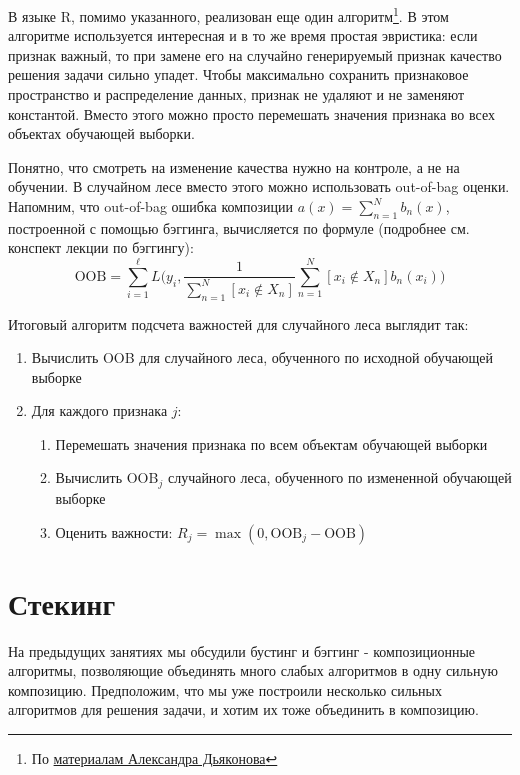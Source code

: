 \documentclass[12pt,a4paper]{article}
\begin{document}
     \par В языке R, помимо указанного, реализован еще один алгоритм\footnote{По \href{http://www.machinelearning.ru/wiki/images/c/cc/PZAD2016_09_rf.pdf}{материалам Александра Дьяконова}}. В этом алгоритме используется интересная и в то же время простая эвристика: если признак важный, то при замене его на случайно генерируемый признак качество решения задачи сильно упадет. Чтобы максимально сохранить признаковое пространство и распределение данных, признак не удаляют и не заменяют константой. Вместо этого можно просто перемешать значения признака во всех объектах обучающей выборки.
     
     Понятно, что смотреть на изменение качества нужно на контроле, а не на обучении. В случайном лесе вместо этого можно использовать  out-of-bag оценки. Напомним, что out-of-bag ошибка композиции $a(x) = \sum_{n=1}^N b_n(x)$, построенной с помощью бэггинга, вычисляется по формуле (подробнее см. конспект лекции по бэггингу):
     \[
     \text{OOB} = \sum_{i=1}^\ell L\biggl(y_i, \frac 1 {\sum_{n=1}^N [x_i \notin X_n]} \sum_{n=1}^N [x_i \notin X_n] b_n(x_i)\biggr)
     \]
     
     Итоговый алгоритм подсчета важностей для случайного леса выглядит так:
     \begin{enumerate}
     	\item Вычислить OOB для случайного леса, обученного по исходной обучающей выборке
     	\item Для каждого признака $j$:
     	\begin{enumerate}
     		\item Перемешать значения признака по всем объектам обучающей выборки
     		\item Вычислить OOB$_j$ случайного леса, обученного по измененной обучающей выборке
     		\item Оценить важности: $R_j = \max(0, \text{OOB}_j-\text{OOB})$
     	\end{enumerate}
     \end{enumerate}
 
    \section{Стекинг}
    На предыдущих занятиях мы обсудили бустинг и бэггинг - композиционные алгоритмы, позволяющие объединять много слабых алгоритмов в одну сильную композицию. Предположим, что мы уже построили несколько сильных алгоритмов для решения задачи, и хотим их тоже объединить в композицию. 
    
\end{document}
